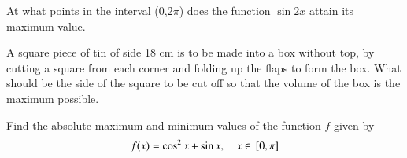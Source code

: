 \item
At what points in the interval (0,2$\pi$) does the function $\sin2x$ attain its maximum value.
\label{12/6/5/8/1}
%
\item A square piece of tin of side 18 cm is to be made into a box without top, by cutting a square from each corner and folding up the flaps to form the box. What should be the side of the square to be cut off so that the volume of the box is the maximum possible.\\
	\solution

\item
Find the absolute maximum and minimum values of the function $f$ given by 
\begin{align}
	f(x) = \cos^2x + \sin x,\quad x \in {}\left[0,\pi\right] 
\end{align} 
\label{12/6/6/14/1}
%

\item
\label{12/6/5/6}

\item
\label{12/6/5/7}

\item
\label{12/6/5/8}

\item
\label{12/6/5/10}

\item
\label{12/6/5/11}

\item
\label{12/6/6/14}


